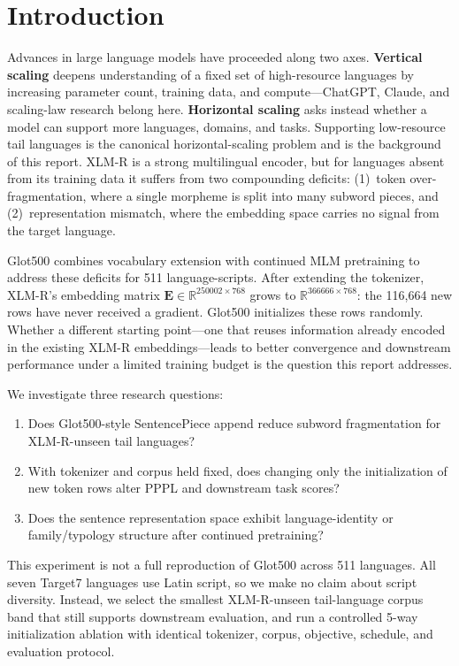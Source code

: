 \section{Introduction}

Advances in large language models have proceeded along two axes.
\textbf{Vertical scaling} deepens understanding of a fixed set of high-resource languages
by increasing parameter count, training data, and compute---ChatGPT, Claude, and scaling-law
research belong here.
\textbf{Horizontal scaling} asks instead whether a model can support more languages,
domains, and tasks.
Supporting low-resource tail languages is the canonical horizontal-scaling problem and
is the background of this report.
XLM-R \citep{conneau2020xlmr} is a strong multilingual encoder, but for languages
absent from its training data it suffers from two compounding deficits:
(1)~token over-fragmentation, where a single morpheme is split into many subword pieces,
and (2)~representation mismatch, where the embedding space carries no signal from
the target language.

Glot500 \citep{imani2023glot500} combines vocabulary extension with continued MLM
pretraining to address these deficits for 511 language-scripts.
After extending the tokenizer, XLM-R's embedding matrix $\mathbf{E}\in\mathbb{R}^{250002\times768}$
grows to $\mathbb{R}^{366666\times768}$: the 116,664 new rows have never received a gradient.
Glot500 initializes these rows randomly.
Whether a different starting point---one that reuses information already encoded in
the existing XLM-R embeddings---leads to better convergence and downstream performance
under a limited training budget is the question this report addresses.

We investigate three research questions:
\begin{enumerate}
  \item Does Glot500-style SentencePiece append reduce subword fragmentation for
        XLM-R-unseen tail languages?
  \item With tokenizer and corpus held fixed, does changing only the initialization of
        new token rows alter PPPL and downstream task scores?
  \item Does the sentence representation space exhibit language-identity or
        family/typology structure after continued pretraining?
\end{enumerate}

This experiment is not a full reproduction of Glot500 across 511 languages.
All seven Target7 languages use Latin script, so we make no claim about script diversity.
Instead, we select the smallest XLM-R-unseen tail-language corpus band that still
supports downstream evaluation, and run a controlled 5-way initialization ablation
with identical tokenizer, corpus, objective, schedule, and evaluation protocol.


